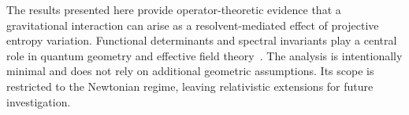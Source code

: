   The results presented here provide operator-theoretic evidence that a gravitational interaction can arise as a
  resolvent-mediated effect of projective entropy variation.
  Functional determinants and spectral invariants play a central role
  in quantum geometry and effective field theory~\cite{dowker1976,polyakov1981}.
  The analysis is intentionally minimal and does not rely on additional geometric assumptions.
  Its scope is restricted to the Newtonian regime, leaving relativistic extensions for future investigation.
